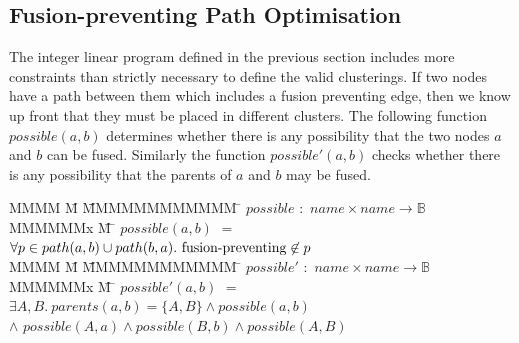 


\subsection{Fusion-preventing Path Optimisation}
\label{clustering:s:OptimisedConstraints}
The integer linear program defined in the previous section includes more constraints than strictly necessary to define the valid clusterings. If two nodes have a path between them which includes a fusion preventing edge, then we know up front that they must be placed in different clusters. The following function $possible(a,b)$ determines whether there is any possibility that the two nodes $a$ and $b$ can be fused. Similarly the function $possible'(a, b)$ checks whether there is any possibility that the parents of $a$ and $b$ may be fused.
%
\begin{tabbing}
MMMM \= M \=     \= MMMMMMMMMMMM    \=  \kill
$possible$ \> $:$     \> $name \times name \to \mathbb{B}$      \\
MMMMMMx        \= M    \= \kill
$possible(a,b)$   
        \> $=$  \>$\forall p \in path(a,b) \cup path(b,a).\ \fusionpreventing \not\in p$
\\[1ex]
MMMM \= M \=     \= MMMMMMMMMMMM    \=  \kill
$possible'$     \> $:$ \> $name \times name \to \mathbb{B}$      \\
MMMMMMx        \= M    \= \kill
$possible'(a,b)$ 
        \> $=$   \>$\exists A, B.\  parents(a,b) = \{A,B\} \wedge possible(a,b)$ \\
        \> $\wedge$ \> $possible(A,a) \wedge possible(B,b) \wedge possible(A,B)$
\end{tabbing}

